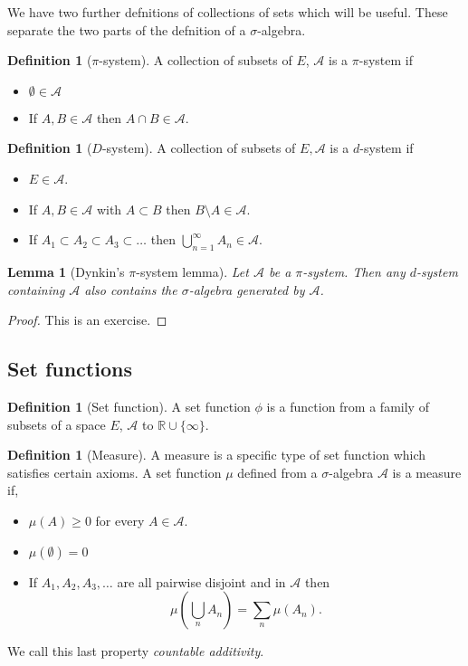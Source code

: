 \documentclass[11pt]{article}
\newtheorem{lem}[thm]{Lemma}
\theoremstyle{definition}
\newtheorem{dfn}[thm]{Definition}
\theoremstyle{remark}
\begin{document}
We have two further defnitions of collections of sets which will be useful. These separate the two parts of the defnition of a $\sigma$-algebra.
\begin{dfn}[$\pi$-system]
A collection of subsets of $E$, $\mathcal{A}$ is a $\pi$-system if
\begin{itemize}
\item $\emptyset \in \mathcal{A}$
\item If $A, B \in \mathcal{A}$ then $A \cap B \in \mathcal{A}$.
\end{itemize}
\end{dfn}

\begin{dfn}[$D$-system]
A collection of subsets of $E, \mathcal{A}$ is a $d$-system if
\begin{itemize}
\item $E \in \mathcal{A}$.
\item If $A, B \in \mathcal{A}$ with $A \subset B$ then $B \setminus A \in \mathcal{A}$.
\item If $A_1 \subset A_2 \subset A_3 \subset \dots$ then $ \bigcup_{n=1}^\infty A_n \in \mathcal{A}$.
\end{itemize}
\end{dfn}
\begin{lem}[Dynkin's $\pi$-system lemma]
Let $\mathcal{A}$ be a $\pi$-system. Then any $d$-system containing $\mathcal{A}$ also contains the $\sigma$-algebra generated by $\mathcal{A}$.
\end{lem}
\begin{proof} This is an exercise.
\end{proof}

\subsection{Set functions}

\begin{dfn}[Set function] A set function $\phi$ is a function from a family of subsets of a space $E$, $\mathcal{A}$ to $\mathbb{R}\cup\{\infty\}$.
\end{dfn}

\begin{dfn}[Measure] A measure is a specific type of set function which satisfies certain axioms. A set function $\mu$ defined from a $\sigma$-algebra $\mathcal{A}$ is a measure if,
\begin{itemize}
\item $\mu(A) \geq 0$ for every $A \in \mathcal{A}$.
\item $\mu(\emptyset) = 0$
\item If $A_1, A_2, A_3, \dots$ are all pairwise disjoint and in $\mathcal{A}$ then 
\[ \mu \left( \bigcup_n A_n \right) = \sum_n \mu(A_n). \]
\end{itemize}
We call this last property \emph{countable additivity}.
\end{dfn}
\end{document}
